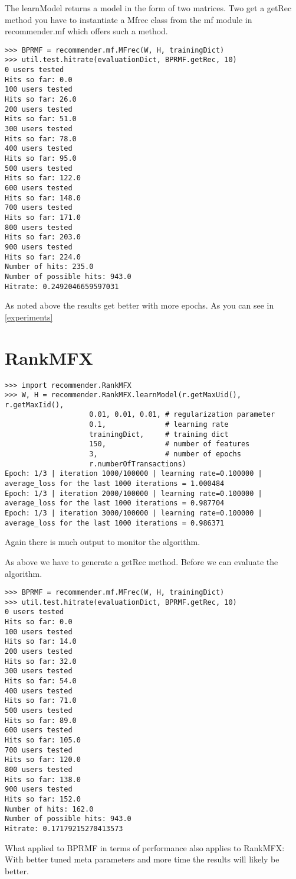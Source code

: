 The learnModel returns a model in the form of two matrices. Two get a 
getRec method you have to instantiate a Mfrec class from the mf module
in recommender.mf which offers such a method.
\begin{lstlisting}
>>> BPRMF = recommender.mf.MFrec(W, H, trainingDict)
>>> util.test.hitrate(evaluationDict, BPRMF.getRec, 10)
0 users tested
Hits so far: 0.0
100 users tested
Hits so far: 26.0
200 users tested
Hits so far: 51.0
300 users tested
Hits so far: 78.0
400 users tested
Hits so far: 95.0
500 users tested
Hits so far: 122.0
600 users tested
Hits so far: 148.0
700 users tested
Hits so far: 171.0
800 users tested
Hits so far: 203.0
900 users tested
Hits so far: 224.0
Number of hits: 235.0
Number of possible hits: 943.0
Hitrate: 0.2492046659597031
\end{lstlisting}
As noted above the results get better with more epochs. As you can see
in \ref{experiments}

\section{RankMFX}
\begin{lstlisting}
>>> import recommender.RankMFX
>>> W, H = recommender.RankMFX.learnModel(r.getMaxUid(), r.getMaxIid(),
                    0.01, 0.01, 0.01, # regularization parameter
                    0.1,              # learning rate
                    trainingDict,     # training dict
                    150,              # number of features
                    3,                # number of epochs
                    r.numberOfTransactions)
Epoch: 1/3 | iteration 1000/100000 | learning rate=0.100000 | average_loss for the last 1000 iterations = 1.000484
Epoch: 1/3 | iteration 2000/100000 | learning rate=0.100000 | average_loss for the last 1000 iterations = 0.987704
Epoch: 1/3 | iteration 3000/100000 | learning rate=0.100000 | average_loss for the last 1000 iterations = 0.986371
\end{lstlisting}
Again there is much output to monitor the algorithm.

As above we have to generate a getRec method. Before we can evaluate the algorithm.
\begin{lstlisting}
>>> BPRMF = recommender.mf.MFrec(W, H, trainingDict)
>>> util.test.hitrate(evaluationDict, BPRMF.getRec, 10)
0 users tested
Hits so far: 0.0
100 users tested
Hits so far: 14.0
200 users tested
Hits so far: 32.0
300 users tested
Hits so far: 54.0
400 users tested
Hits so far: 71.0
500 users tested
Hits so far: 89.0
600 users tested
Hits so far: 105.0
700 users tested
Hits so far: 120.0
800 users tested
Hits so far: 138.0
900 users tested
Hits so far: 152.0
Number of hits: 162.0
Number of possible hits: 943.0
Hitrate: 0.17179215270413573
\end{lstlisting}
What applied to BPRMF in terms of performance also applies to RankMFX:
With better tuned meta parameters and more time the results will likely
be better.


